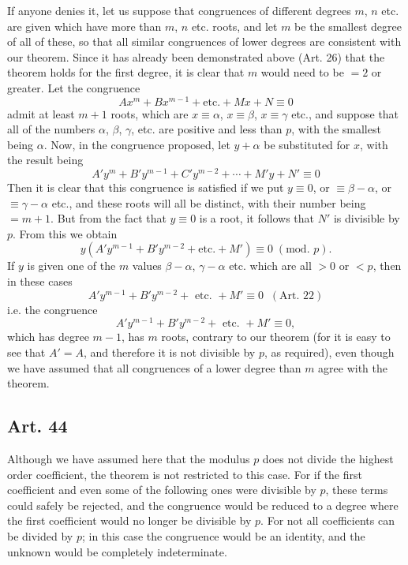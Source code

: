 \documentclass{book}
\theoremstyle{plain}
\theoremstyle{remark}
\begin{document}
If anyone denies it, let us suppose that congruences of different degrees $m$, $n$ etc. are given which have more than $m$, $n$ etc. roots, and let $m$ be the smallest degree of all of these, so that all similar congruences of lower degrees are consistent with our theorem.  Since it has already been demonstrated above (Art. 26) that the theorem holds for the first degree, it is clear that $m$ would need to be $=2$ or greater.  Let the congruence 
\[ Ax^m + Bx^{m-1} + \textrm{etc.} + Mx + N \equiv 0 \]
admit at least $m+1$ roots, which are $x \equiv \alpha$, $x \equiv \beta$, $x \equiv \gamma$ etc., and suppose that all of the numbers $\alpha$, $\beta$, $\gamma$, etc. are positive and less than $p$, with the smallest being $\alpha$.  Now, in the congruence proposed, let $y+\alpha$ be substituted for $x$, with the result being
\[ A' y^m + B' y^{m-1} + C' y^{m-2} + \cdots + M' y + N' \equiv 0 \]
Then it is clear that this congruence is satisfied if we put $y \equiv 0$, or $\equiv \beta-\alpha$, or $\equiv \gamma-\alpha$ etc., and these roots will all be distinct, with their number being $=m+1$.   But from the fact that $y \equiv 0$ is a root, it follows that $N'$ is divisible by $p$. From this we obtain
\[ y(A'y^{m-1} + B'y^{m-2} + \textrm{etc.} +M' ) \equiv 0 \;(\textrm{mod. } p). \]
If $y$ is given one of the $m$ values $\beta-\alpha$, $\gamma-\alpha$ etc. which are all $>0$ or $<p$, then in these cases
\[ A'y^{m-1} + B'y^{m-2} + \textrm{ etc. } + M' \equiv 0 \;\;(\textrm{Art. 22}) \]
i.e. the congruence 
\[ A'y^{m-1} + B'y^{m-2} + \textrm{ etc. } + M' \equiv 0, \]
which has degree $m-1$, has $m$ roots, contrary to our theorem (for it is easy to see that $A'=A$, and therefore it is not divisible by $p$, as required), even though we have assumed that all congruences of a lower degree than $m$ agree with the theorem.

\subsection*{Art. 44}

Although we have assumed here that the modulus $p$ does not divide the highest order coefficient, the theorem is not restricted to this case.  For if the first coefficient and even some of the following ones were divisible by $p$, these terms could safely be rejected, and the congruence would be reduced to a degree where the first coefficient would no longer be divisible by $p$.  For not all coefficients can be divided by $p$; in this case the congruence would be an identity, and the unknown would be completely indeterminate.
\end{document}
